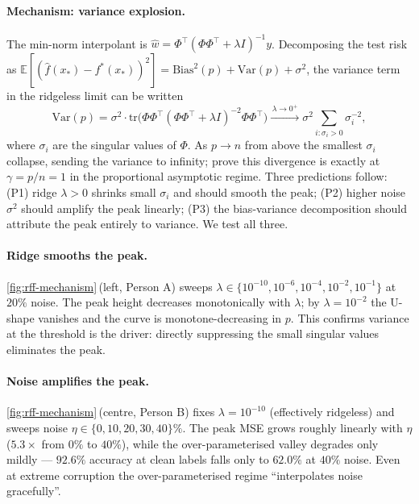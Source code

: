 \paragraph{Mechanism: variance explosion.} The min-norm interpolant is $\hat{w} = \Phi^\top(\Phi\Phi^\top + \lambda I)^{-1}y$. Decomposing the test risk as $\mathbb{E}[(\hat f(x_*) - f^*(x_*))^2] = \mathrm{Bias}^2(p) + \mathrm{Var}(p) + \sigma^2$, the variance term in the ridgeless limit can be written
\begin{equation}
  \label{eq:variance}
  \mathrm{Var}(p) = \sigma^2 \cdot \mathrm{tr}\big(\Phi\Phi^\top(\Phi\Phi^\top+\lambda I)^{-2}\Phi\Phi^\top\big) \xrightarrow{\,\lambda\to0^+\,} \sigma^2 \!\sum_{i:\sigma_i>0}\!\sigma_i^{-2},
\end{equation}
where $\sigma_i$ are the singular values of $\Phi$. As $p \to n$ from above the smallest $\sigma_i$ collapse, sending the variance to infinity; \citet{hastie2022surprises} prove this divergence is exactly at $\gamma = p/n = 1$ in the proportional asymptotic regime. Three predictions follow: (P1) ridge $\lambda > 0$ shrinks small $\sigma_i$ and should smooth the peak; (P2) higher noise $\sigma^2$ should amplify the peak linearly; (P3) the bias-variance decomposition should attribute the peak entirely to variance. We test all three.

\paragraph{Ridge smooths the peak.} \cref{fig:rff-mechanism}\,(left, Person A) sweeps $\lambda\in\{10^{-10}, 10^{-6}, 10^{-4}, 10^{-2}, 10^{-1}\}$ at $20\%$ noise. The peak height decreases monotonically with $\lambda$; by $\lambda=10^{-2}$ the U-shape vanishes and the curve is monotone-decreasing in $p$. This confirms variance at the threshold is the driver: directly suppressing the small singular values eliminates the peak.

\paragraph{Noise amplifies the peak.} \cref{fig:rff-mechanism}\,(centre, Person B) fixes $\lambda=10^{-10}$ (effectively ridgeless) and sweeps noise $\eta\in\{0,10,20,30,40\}\%$. The peak MSE grows roughly linearly with $\eta$ ($5.3\times$ from $0\%$ to $40\%$), while the over-parameterised valley degrades only mildly --- $92.6\%$ accuracy at clean labels falls only to $62.0\%$ at $40\%$ noise. Even at extreme corruption the over-parameterised regime ``interpolates noise gracefully''.

